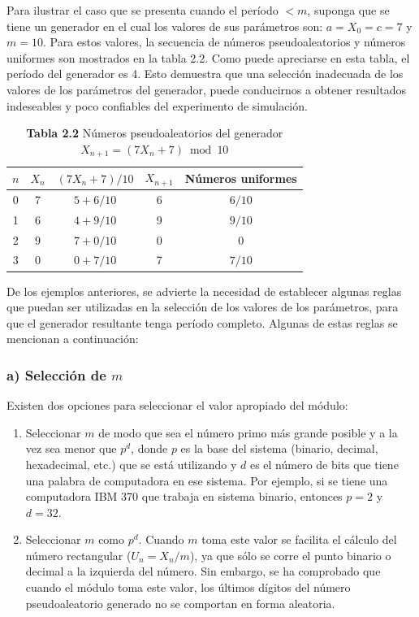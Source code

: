 \documentclass[11pt,letterpaper]{report}
\begin{document}
Para ilustrar el caso que se presenta cuando el período $< m$, suponga
que se tiene un generador en el cual los valores de sus parámetros son:
$a = X_0 = c = 7$ y $m = 10$. Para estos valores, la secuencia de
números pseudoaleatorios y números uniformes son mostrados en la tabla
2.2. Como puede apreciarse en esta tabla, el período del generador es 4.
Esto demuestra que una selección inadecuada de los valores de los
parámetros del generador, puede conducirnos a obtener resultados
indeseables y poco confiables del experimento de simulación.

\begin{table}[H]
\centering
\caption*{\textbf{Tabla 2.2} Números pseudoaleatorios del generador $X_{n+1} = (7X_n + 7) \bmod 10$}
\begin{tabular}{ccccc}
\toprule
$n$ & $X_n$ & $(7X_n+7)/10$ & $X_{n+1}$ & Números uniformes \\
\midrule
0 & 7 & $5 + 6/10$ & 6 & $6/10$ \\
1 & 6 & $4 + 9/10$ & 9 & $9/10$ \\
2 & 9 & $7 + 0/10$ & 0 & $0$ \\
3 & 0 & $0 + 7/10$ & 7 & $7/10$ \\
\bottomrule
\end{tabular}
\end{table}

De los ejemplos anteriores, se advierte la necesidad de establecer
algunas reglas que puedan ser utilizadas en la selección de los valores
de los parámetros, para que el generador resultante tenga período
completo. Algunas de estas reglas se mencionan a continuación:

\subsubsection*{a) Selección de $m$}

Existen dos opciones para seleccionar el valor apropiado del módulo:

\begin{enumerate}
\item Seleccionar $m$ de modo que sea el número primo más grande
posible y a la vez sea menor que $p^d$, donde $p$ es la base del sistema
(binario, decimal, hexadecimal, etc.) que se está utilizando y $d$ es el
número de bits que tiene una palabra de computadora en ese sistema. Por
ejemplo, si se tiene una computadora IBM 370 que trabaja en sistema
binario, entonces $p=2$ y $d=32$.
\item Seleccionar $m$ como $p^d$. Cuando $m$ toma este valor se facilita
el cálculo del número rectangular ($U_n = X_n/m$), ya que sólo se corre
el punto binario o decimal a la izquierda del número. Sin embargo, se ha
comprobado que cuando el módulo toma este valor, los últimos dígitos del
número pseudoaleatorio generado no se comportan en forma aleatoria.
\end{enumerate}
\end{document}
